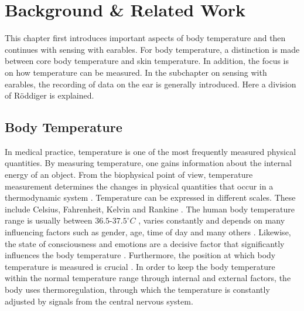 \chapter{Background \& Related Work}
\label{ch:Background}
This chapter first introduces important aspects of body temperature and then continues with sensing with earables.
For body temperature, a distinction is made between core body temperature and skin temperature. 
In addition, the focus is on how temperature can be measured. 
In the subchapter on sensing with earables, the recording of data on the ear is generally introduced. 
Here a division of Röddiger \cite{roddigerSensingEarablesSystematic2022a} is explained.

\section{Body Temperature}
\label{Background:BodyTemperature}
In medical practice, temperature is one of the most frequently measured physical quantities.
By measuring temperature, one gains information about the internal energy of an object.
From the biophysical point of view, temperature measurement determines the changes in physical quantities that occur in a thermodynamic system \cite{dolibogComparativeAnalysisHuman2022}.
Temperature can be expressed in different scales.
These include Celsius, Fahrenheit, Kelvin and Rankine \cite{grodzinskyUnderstandingFeverBody2020}.
The human body temperature range is usually between $36.5\text{-}37.5^\circ C$ \cite{hutchisonHypothermiaTherapyTraumatic2008}, varies constantly and depends on many influencing factors such as gender, age, time of day and many others \cite{sund-levanderNormalOralRectal2002}.
Likewise, the state of consciousness and emotions are a decisive factor that significantly influences the body temperature \cite{barbosaescobarTemperatureEmotions2021}.
Furthermore, the position at which body temperature is measured is crucial \cite{Physiologie9783137960072ZVAB}.
In order to keep the body temperature within the normal temperature range through internal and external factors, the body uses thermoregulation, through which the temperature is constantly adjusted by signals from the central nervous system.

